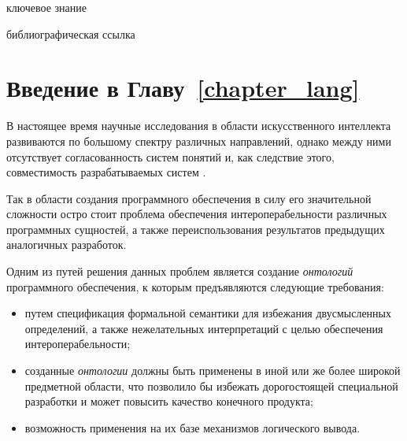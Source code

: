 \begin{SCn}
    \begin{scnrelfromlist}{ключевое знание}
    \end{scnrelfromlist}

    \bigskip

    \begin{scnrelfromlist}{библиографическая ссылка}
    \end{scnrelfromlist}

\end{SCn}

\section*{Введение в Главу~\ref{chapter_lang}}

В настоящее время научные исследования в области искусственного интеллекта развиваются по большому спектру различных направлений, однако между ними отсутствует согласованность систем понятий и, как следствие этого, совместимость разрабатываемых систем \cite{Golenkov2021}.

Так в области создания программного обеспечения в силу его значительной сложности остро стоит проблема обеспечения интероперабельности различных программных сущностей, а также переиспользования результатов предыдущих аналогичных разработок.

Одним из путей решения данных проблем является создание \textit{онтологий} программного обеспечения, к которым предъявляются следующие требования\cite{Pileggi2018}:
\begin{itemize}
    \item путем спецификация формальной семантики для избежания двусмысленных определений, а также нежелательных интерпретаций с целью обеспечения интероперабельности;
    \item созданные \textit{онтологии} должны быть применены в иной или же более широкой предметной области, что позволило бы избежать дорогостоящей специальной разработки и может повысить качество конечного продукта;
    \item возможность применения на их базе механизмов логического вывода.
\end{itemize}

